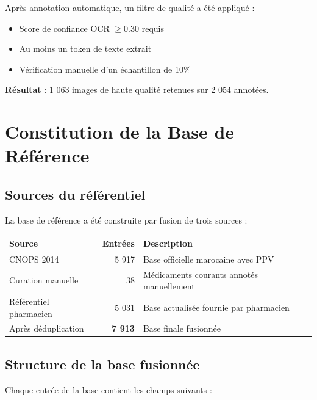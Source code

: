 \documentclass[12pt,a4paper]{report}
\begin{document}
Apr\`es annotation automatique, un filtre de qualit\'e a \'et\'e appliqu\'e :
\begin{itemize}
  \item Score de confiance OCR $\geq 0.30$ requis
  \item Au moins un token de texte extrait
  \item V\'erification manuelle d'un \'echantillon de 10\%
\end{itemize}

\textbf{R\'esultat} : 1 063 images de haute qualit\'e retenues sur 2 054 annot\'ees.

\section{Constitution de la Base de R\'ef\'erence}

\subsection{Sources du r\'ef\'erentiel}

La base de r\'ef\'erence a \'et\'e construite par fusion de trois sources :

\begin{center}
\begin{tabular}{lrl}
\toprule
\textbf{Source} & \textbf{Entr\'ees} & \textbf{Description} \\
\midrule
CNOPS 2014 & 5 917 & Base officielle marocaine avec PPV \\
Curation manuelle & 38 & M\'edicaments courants annot\'es manuellement \\
R\'ef\'erentiel pharmacien & 5 031 & Base actualis\'ee fournie par pharmacien \\
\midrule
Apr\`es d\'eduplication & \textbf{7 913} & Base finale fusionn\'ee \\
\bottomrule
\end{tabular}
\end{center}

\subsection{Structure de la base fusionn\'ee}

Chaque entr\'ee de la base contient les champs suivants :
\end{document}
